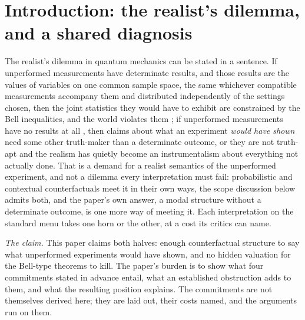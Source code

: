 \section{Introduction: the realist's dilemma, and a shared diagnosis}\label{sec:intro}

The realist's dilemma in quantum mechanics can be stated in a sentence. If unperformed measurements have determinate results, and those results are the values of variables on one common sample space, the same whichever compatible measurements accompany them and distributed independently of the settings chosen, then the joint statistics they would have to exhibit are constrained by the Bell inequalities, and the world violates them \cite{bell1964einstein}; if unperformed measurements have no results at all \cite{peres1978unperformed}, then claims about what an experiment \emph{would have shown} need some other truth-maker than a determinate outcome, or they are not truth-apt and the realism has quietly become an instrumentalism about everything not actually done. That is a demand for a realist semantics of the unperformed experiment, and not a dilemma every interpretation must fail: probabilistic and contextual counterfactuals meet it in their own ways, the scope discussion below admits both, and the paper's own answer, a modal structure without a determinate outcome, is one more way of meeting it. Each interpretation on the standard menu takes one horn or the other, at a cost its critics can name.

\textit{The claim.} This paper claims both halves: enough counterfactual structure to say what unperformed experiments would have shown, and no hidden valuation for the Bell-type theorems to kill. The paper's burden is to show what four commitments stated in advance entail, what an established obstruction adds to them, and what the resulting position explains. The commitments are not themselves derived here; they are laid out, their costs named, and the arguments run on them.

